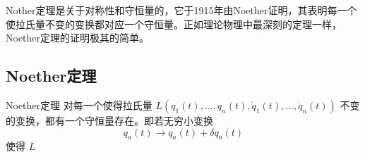 
Nother定理是关于对称性和守恒量的，它于1915年由Noether证明，其表明每一个使拉氏量不变的变换都对应一个守恒量。正如理论物理中最深刻的定理一样，Noether定理的证明极其的简单。

\subsection{Noether定理}
\begin{theorem}{Noether定理}
对每一个使得拉氏量 $L(q_1(t),\ldots,q_n(t),\dot q_1(t),\ldots,\dot q_n(t))$ 不变的变换，都有一个守恒量存在。即若无穷小变换
\begin{equation}
q_a(t)\rightarrow q_a(t)+\delta q_a(t)
\end{equation}
使得 $L$

\end{theorem}
